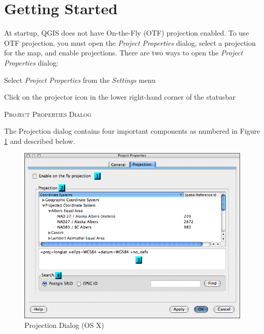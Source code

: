 \section{Getting Started}
At startup, QGIS does not have On-the-Fly (OTF) projection enabled. To use OTF
projection, you must open the \textit{Project Properties} dialog, select a
projection for the map,  and enable projections.  There are two ways to open
the \textit{Project Properties} dialog:
\begin{compactenum}
\item Select \textit{Project Properties} from the \textit{Settings} menu
\item Click on the projector icon in the lower right-hand corner of the
statusbar
\end{compactenum}
\begin{Tip}
 \caption{\textsc{Project Properties Dialog}}
\end{Tip}
The Projection dialog contains four important components as numbered in Figure
\ref{fig:projections} and described below.
\begin{figure}[h]
   \begin{center}
   \caption{Projection Dialog (OS X)}\label{fig:projections}\smallskip
   \includegraphics[scale=.70]{qgis_user_guide_images/projectiondialog}
\end{center}  
\end{figure}
